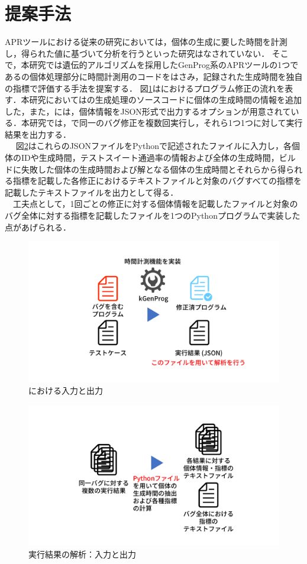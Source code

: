\documentclass[uplatex,dvipdfmx,a4paper]{jsarticle}
\let\oldcite\cite
\renewcommand{\cite}[1]{\xspace\oldcite{#1}}
\begin{document}
\section{提案手法} \label{sec:sgst}
APRツールにおける従来の研究においては，個体の生成に要した時間を計測し，得られた値に基づいて分析を行うといった研究はなされていない．
そこで，本研究では遺伝的アルゴリズムを採用したGenProg\cite{le2011genprog}系のAPRツールの1つである\kgp\cite{higo2018kgenprog}の個体処理部分に時間計測用のコードをはさみ，記録された生成時間を独自の指標で評価する手法を提案する．
図\ref{fig:sgst_apr}は\kgp におけるプログラム修正の流れを表す．本研究においては\kgp の生成処理のソースコードに個体の生成時間の情報を追加した，また，\kgp には，個体情報をJSON形式で出力するオプションが用意されている．本研究では，\kgp で同一のバグ修正を複数回実行し，それら1つ1つに対して実行結果を出力する．\\　
図\ref{fig:sgst_flow}はこれらのJSONファイルをPythonで記述されたファイルに入力し，各個体のIDや生成時間，テストスイート通過率の情報および全体の生成時間，ビルドに失敗した個体の生成時間および解となる個体の生成時間とそれらから得られる指標を記載した各修正におけるテキストファイルと対象のバグすべての指標を記載したテキストファイルを出力として得る．\\　工夫点として，1回ごとの修正に対する個体情報を記載したファイルと対象のバグ全体に対する指標を記載したファイルを1つのPythonプログラムで実装した点があげられる．
\begin{figure}[t]
  \centering
  \includegraphics[width=\linewidth]{fig/sgst_apr.pdf}
  \caption{\kgp における入力と出力}
  \label{fig:sgst_apr}
\end{figure}
\begin{figure}[t]
  \centering
  \includegraphics[width=\linewidth]{fig/sgst_flow.pdf}
  \caption{実行結果の解析：入力と出力}
  \label{fig:sgst_flow}
\end{figure}
\end{document}
